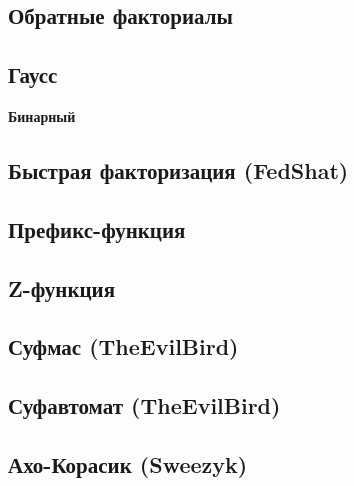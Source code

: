 \documentclass[a4paper]{article}
\begin{document}
\begin{multicols*}{2}
        \subsection{Обратные факториалы}
            
        
        \subsection{Гаусс}
            
            
            \textbf{Бинарный}
            
        
        \subsection{Быстрая факторизация (FedShat)}
            

        \subsection{Префикс-функция}
            
            
        \subsection{Z-функция}
            
            
        \subsection{Суфмас (TheEvilBird)}
            
            
        \subsection{Суфавтомат (TheEvilBird)}
            
        
        \subsection{Ахо-Корасик (Sweezyk)}
            
            

\end{multicols*}
\end{document}
